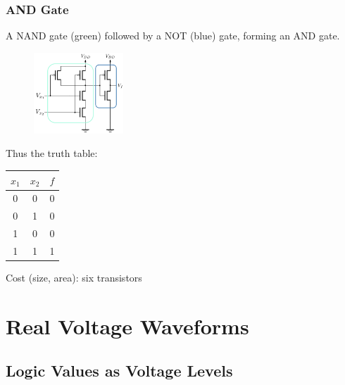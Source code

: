 \documentclass[12pt,openany, tikz,border=10pt]{book}
\begin{document}
			      	\subsubsection{AND Gate}
			      	A NAND gate (green) followed by a NOT (blue) gate, forming an AND gate.
			      	\begin{figure}[h]
			      		\centering
			      		\includegraphics[width=0.3\textwidth]{circuits/9.1.5_3.png}
			      	\end{figure}
			      	        
			      	Thus the truth table:
			      	        
			      	\begin{center}
			      		\begin{tabular}{cc|c}
			      			\hline
			      			\( x_1 \) & \( x_2 \) & \( f \) \\
			      			\hline
			      			0         & 0         & 0       \\
			      			0         & 1         & 0       \\
			      			1         & 0         & 0       \\
			      			1         & 1         & 1       \\
			      			\hline
			      		\end{tabular}
			      	\end{center}
			      	        
			      	Cost (size, area): six transistors
			      	
			      	
			      	\section{Real Voltage Waveforms}
			      	\subsection{Logic Values as Voltage Levels}
			      	\vspace*{5px}
			      	
\end{document}
